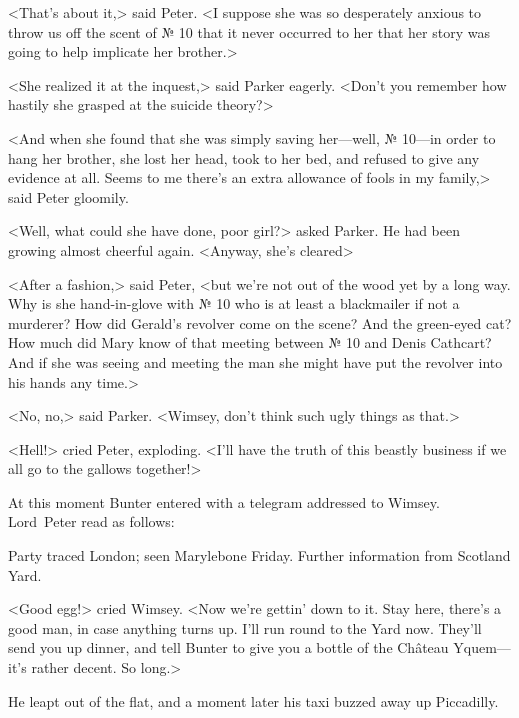 <That's about it,> said Peter. <I suppose she was so desperately anxious to throw us off the scent of № 10 that it never occurred to her that her story was going to help implicate her brother.>

<She realized it at the inquest,> said Parker eagerly. <Don't you remember how hastily she grasped at the suicide theory?>

<And when she found that she was simply saving her—well, № 10—in order to hang her brother, she lost her head, took to her bed, and refused to give any evidence at all. Seems to me there's an extra allowance of fools in my family,> said Peter gloomily.

<Well, what could she have done, poor girl?> asked Parker. He had been growing almost cheerful again. <Anyway, she's cleared\longdash>

<After a fashion,> said Peter, <but we're not out of the wood yet by a long way. Why is she hand-in-glove with № 10 who is at least a blackmailer if not a murderer? How did Gerald's revolver come on the scene? And the green-eyed cat? How much did Mary know of that meeting between № 10 and Denis Cathcart? And if she was seeing and meeting the man she might have put the revolver into his hands any time.>

<No, no,> said Parker. <Wimsey, don't think such ugly things as that.>

<Hell!> cried Peter, exploding. <I'll have the truth of this beastly business if we all go to the gallows together!>

At this moment Bunter entered with a telegram addressed to Wimsey. Lord~Peter read as follows:

\begin{telegram}{}
	Party traced London; seen Marylebone Friday. Further information from Scotland Yard.
\end{telegram}

<Good egg!> cried Wimsey. <Now we're gettin' down to it. Stay here, there's a good man, in case anything turns up. I'll run round to the Yard now. They'll send you up dinner, and tell Bunter to give you a bottle of the Château Yquem—it's rather decent. So long.>

He leapt out of the flat, and a moment later his taxi buzzed away up Piccadilly.
